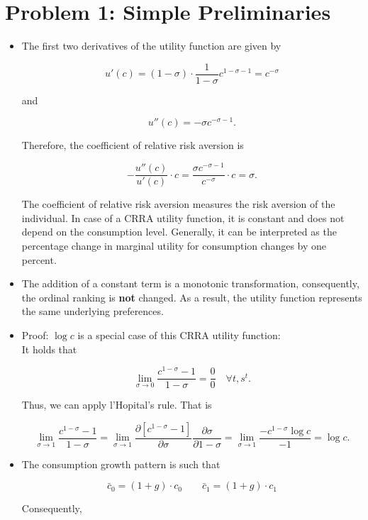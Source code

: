 \documentclass[12pt,a4paper]{article}
\begin{document}
\section*{Problem 1: Simple Preliminaries}

\begin{itemize}
  \item The first two derivatives of the utility function are given by

      $$ u'(c) = (1-\sigma) \cdot \frac{1}{1-\sigma} c^{1-\sigma - 1} = c^{-\sigma} $$

    and

      $$ u''(c) = -\sigma c^{-\sigma -1}.$$

    Therefore, the coefficient of relative risk aversion is

      $$ -\frac{u''(c)}{u'(c)}\cdot c = \frac{\sigma c^{-\sigma -1}}{c^{-\sigma}} \cdot c = \sigma. $$

The coefficient of relative risk aversion measures the risk aversion of the individual. In case of a CRRA utility function, it is constant and does not depend on the consumption level. Generally, it can be interpreted as the percentage change in marginal utility for consumption changes by one percent.

  \item The addition of a constant term is a monotonic transformation, consequently, the ordinal ranking is \textbf{not} changed. As a result, the utility function represents the same underlying preferences.

  \item Proof: $\log c$ is a special case of this CRRA utility function: \\
It holds that

    $$ \lim_{\sigma \to 0} \frac{c^{1-\sigma} - 1}{1-\sigma} = \frac{0}{0} \quad \forall t, s^t.$$

Thus, we can apply l'Hopital's rule. That is

    $$\lim_{\sigma \to 1} \frac{c^{1-\sigma} - 1}{1-\sigma} = \lim_{\sigma \to 1} \frac{\partial [c^{1-\sigma} - 1]}{\partial \sigma} \frac{\partial \sigma}{\partial 1-\sigma} = \lim_{\sigma \to 1} \frac{- c^{1-\sigma} \log c}{-1} = \log c.$$

  \item The consumption growth pattern is such that

    $$  \bar{c}_0 = (1 + g) \cdot c_0 \qquad \bar{c}_1 = (1 + g) \cdot c_1 $$

Consequently,


\end{itemize}
\end{document}
